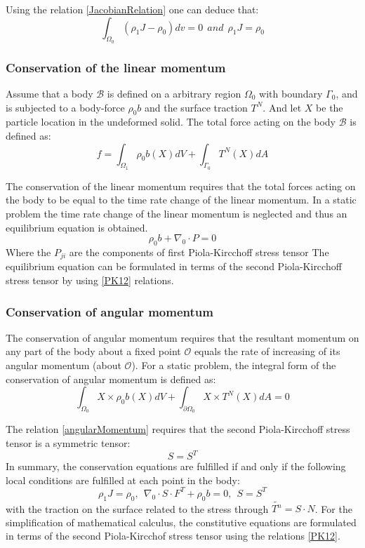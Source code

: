Using the relation \ref{JacobianRelation} one can deduce that:
\begin{equation}
\int_{\Omega_0} \left( \rho_1 J - \rho_0\right)dv = 0 \  \ and \  \ \rho_1 J = \rho_0
\end{equation}
\subsubsection*{Conservation of the linear momentum}

Assume that a body $\mathcal{B}$ is defined on a arbitrary region $\Omega_0$ with boundary $\Gamma_0$, and is subjected to a body-force $\rho_0  b$ and the surface traction $T^N$. And let $X$ be the particle location in the undeformed solid.
 The total force acting on the body $\mathcal{B}$ is defined as:
\begin{equation}
f = \int_{\Omega_1}\rho_0 b(X)dV + \int_{\Gamma_0} T^N(X)dA
\end{equation}
 
The conservation of the linear momentum requires that the total forces acting on the body to be equal to the time rate change of the linear momentum. In a static problem the time rate change of the linear momentum is neglected and thus an equilibrium equation is obtained.
\begin{equation}
\rho_0 b+\nabla_0 \cdot P  = 0
\end{equation}
Where the $P_{ji}$ are the components of first Piola-Kircchoff stress tensor
The equilibrium equation can be formulated in terms of the second Piola-Kircchoff stress tensor by using \ref{PK12} relations.
\subsubsection*{Conservation of angular momentum}
The conservation of angular momentum requires that the resultant momentum on any part of the body about a fixed point $\mathcal{O}$ equals the rate of increasing of its angular momentum (about $\mathcal{O}$). For a static problem, the integral form of the conservation of angular momentum is defined as:
\begin{equation}
\label{angularMomentum}
\int_{\Omega_0} X \times \rho_0 b(X)dV + \int_{\partial \Omega_0} X \times  T^N(X)dA = 0
\end{equation}

The relation \ref{angularMomentum} requires that the second Piola-Kircchoff stress tensor is a symmetric tensor:
\begin{equation}
S = S^T
\end{equation}
In summary, the conservation equations are fulfilled if and only if the following local conditions are fulfilled at each point in the body:
\begin{equation}
\rho_1 J = \rho_0, \ \ \nabla_0 \cdot S \cdot F^T + \rho_0 b =0, \ \ S=S^T 
\end{equation}
with the traction on the surface related to the stress through $\tilde{T^n} = S \cdot N$.
 For the simplification of mathematical calculus, the constitutive equations are formulated in terms of the second Piola-Kircchof stress tensor using the relations \ref{PK12}.

